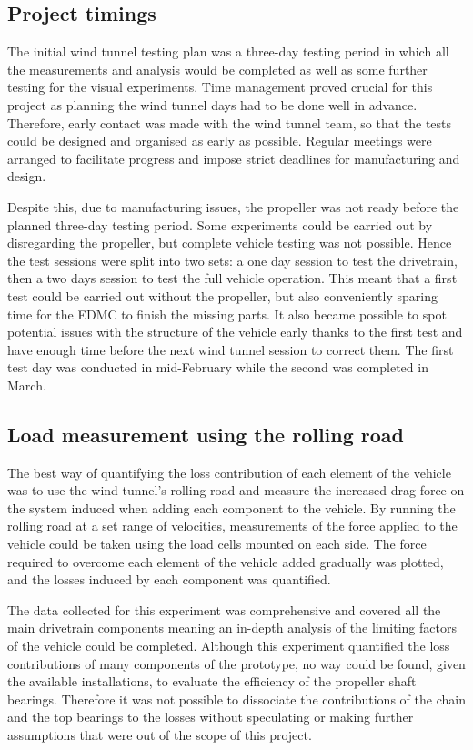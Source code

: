 \subsection{Project timings}

The initial wind tunnel testing plan was a three-day testing period in which all the measurements and analysis would be completed as well as some further testing for the visual experiments. Time management proved crucial for this project as planning the wind tunnel days had to be done well in advance. Therefore, early contact was made with the wind tunnel team, so that the tests could be designed and organised as early as possible. Regular meetings were arranged to facilitate progress and impose strict deadlines for manufacturing and design.

Despite this, due to manufacturing issues, the propeller was not ready before the planned three-day testing period. Some experiments could be carried out by disregarding the propeller, but complete vehicle testing was not possible. Hence the test sessions were split into two sets: a one day session to test the drivetrain, then a two days session to test the full vehicle operation. This meant that a first test could be carried out without the propeller, but also conveniently sparing time for the EDMC to finish the missing parts. It also became possible to spot potential issues with the structure of the vehicle early thanks to the first test and have enough time before the next wind tunnel session to correct them. The first test day was conducted in mid-February while the second was completed in March.
 

\subsection{Load measurement using the rolling road}

The best way of quantifying the loss contribution of each element of the vehicle was to use the wind tunnel’s rolling road and measure the increased drag force on the system induced when adding each component to the vehicle. By running the rolling road at a set range of velocities, measurements of the force applied to the vehicle could be taken using the load cells mounted on each side. The force required to overcome each element of the vehicle added gradually was plotted, and the losses induced by each component was quantified.

The data collected for this experiment was comprehensive and covered all the main drivetrain components meaning an in-depth analysis of the limiting factors of the vehicle could be completed. Although this experiment quantified the loss contributions of many components of the prototype, no way could be found, given the available installations, to evaluate the efficiency of the propeller shaft bearings. Therefore it was not possible to dissociate the contributions of the chain and the top bearings to the losses without speculating or making further assumptions that were out of the scope of this project.



